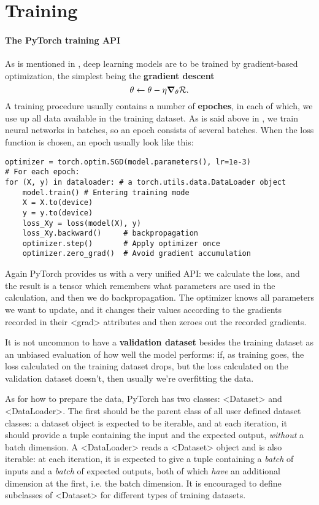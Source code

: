 \documentclass[hyperref, a4paper, 12pt]{report}
\newcommand*{\concept}[1]{{\textbf{#1}}}
\def\texttt#1{<#1>}%
\newcommand{\shortcode}[1]{\texttt{#1}}
\begin{document}
\section{Training}

\paragraph*{The PyTorch training API}
As is mentioned in , deep learning models are to be trained by gradient-based optimization,
the simplest being the \concept{gradient descent}
\begin{equation}
    \theta \leftarrow \theta - \eta \grad_\theta \mathcal{R}.
    \label{eq:sgd-example}
\end{equation}
A training procedure usually contains a number of \concept{epoches},
in each of which, we use up all data available in the training dataset.
As is said above in , 
we train neural networks in batches, so an epoch consists of several batches.
When the loss function is chosen, 
an epoch usually look like this:

\begin{lstlisting}
optimizer = torch.optim.SGD(model.parameters(), lr=1e-3)
# For each epoch:
for (X, y) in dataloader: # a torch.utils.data.DataLoader object
    model.train() # Entering training mode 
    X = X.to(device)
    y = y.to(device)
    loss_Xy = loss(model(X), y)
    loss_Xy.backward()     # backpropagation
    optimizer.step()       # Apply optimizer once 
    optimizer.zero_grad()  # Avoid gradient accumulation
\end{lstlisting}

Again PyTorch provides us with a very unified API:
we calculate the loss, and the result is a tensor which remembers what parameters are used in the calculation,
and then we do backpropagation.
The optimizer knows all parameters we want to update,
and it changes their values according to the gradients recorded in their \shortcode{grad} attributes
and then zeroes out the recorded gradients.

It is not uncommon to have a \concept{validation dataset} besides the training dataset
as an unbiased evaluation of how well the model performs:
if, as training goes, the loss calculated on the training dataset drops,
but the loss calculated on the validation dataset doesn't,
then usually we're overfitting the data.

As for how to prepare the data,
PyTorch has two classes: \shortcode{Dataset} and \shortcode{DataLoader}.
The first should be the parent class of all user defined dataset classes:
a dataset object is expected to be iterable,
and at each iteration, it should provide a tuple
containing the input and the expected output,
\emph{without} a batch dimension.
A \shortcode{DataLoader} reads a \shortcode{Dataset} object and is also iterable:
at each iteration, it is expected to give a tuple 
containing a \emph{batch} of inputs and a \emph{batch} of expected outputs,
both of which \emph{have} an additional dimension at the first, i.e. the batch dimension.
It is encouraged to define subclasses of \shortcode{Dataset}
for different types of training datasets.
\end{document}
